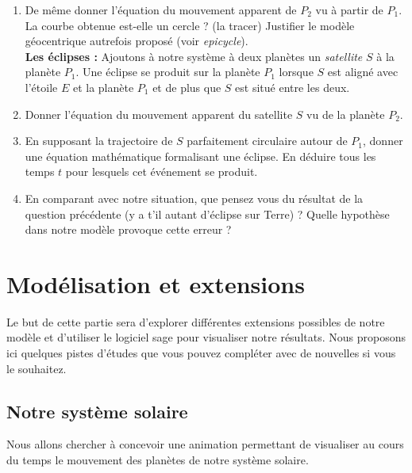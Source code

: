 \documentclass{../ficheTDTP}
\begin{document}
\begin{enumerate}
\item De même donner l'équation du mouvement apparent de $P_2$ vu à partir de $P_1$. La courbe obtenue est-elle un cercle ? (la tracer) Justifier le modèle géocentrique autrefois proposé (voir \textit{epicycle}).\\

\noindent \textbf{Les éclipses : } Ajoutons à notre système à deux planètes un \textit{satellite} $S$ à la planète $P_1$. Une éclipse se produit sur la planète $P_1$ lorsque $S$ est aligné avec l'étoile $E$ et la planète $P_1$ et de plus que $S$ est situé entre les deux.\\

\item Donner l'équation du mouvement apparent du satellite $S$ vu de la planète $P_2$.

\item En supposant la trajectoire de $S$ parfaitement circulaire autour de $P_1$, donner une équation mathématique formalisant une éclipse. En déduire tous les temps $t$ pour lesquels cet événement se produit.

\item En comparant avec notre situation, que pensez vous du résultat de la question précédente (y a t'il autant d'éclipse sur Terre) ? Quelle hypothèse dans notre modèle provoque cette erreur ?

\end{enumerate}



	\section{Modélisation et extensions}
	
	Le but de cette partie sera d'explorer différentes extensions possibles de notre modèle et d'utiliser le logiciel sage pour visualiser notre résultats. Nous proposons ici quelques pistes d'études que vous pouvez compléter avec de nouvelles si vous le souhaitez.
	

	\subsection{Notre système solaire} Nous allons chercher à concevoir une animation permettant de visualiser au cours du temps le mouvement des planètes de notre système solaire.
	
\end{document}
